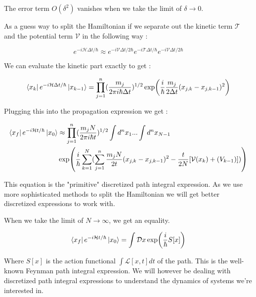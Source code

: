 The error term $O(\delta^2)$ vanishes when we take the limit of $\delta \to 0$.

As a guess way to split the Hamiltonian if we separate out the kinetic term $\mathcal{T}$ and the potential term $\mathcal{V}$ in the following way :

\begin{equation}\label{4.x}
e^{-i\mathcal{H}\Delta t/\hbar} \approx e^{-i\mathcal{V}\Delta t/2\hbar}e^{-i\mathcal{T}\Delta t/\hbar}e^{-i\mathcal{V}\Delta t/2\hbar} 
\end{equation}

We can evaluate the kinetic part exactly to get :

\begin{equation} \label{4.x}
\bra{x_k}e^{-i\mathcal{H} \Delta t/\hbar}\ket{x_{k-1}} = \prod_{j=1}^{n} (\frac{m_j}{2\pi i \hbar \Delta t})^{1/2} \exp(\frac{i}{\hbar} \frac{m_j}{2\Delta t} (x_{j,k} - x_{j, k-1})^2)
\end{equation}

Plugging this into the propagation expression we get :

\begin{equation} \label{4.x}
    \begin{split}
        \bra{x_f} e^{-i\mathcal{H}t/\hbar} \ket{x_0} & \approx \prod_{j=1}^{n} (\frac{m_j N}{2\pi i \hbar t})^{1/2}  \int d^n x_1 ... \int d^n x_{N-1} \\ & \exp(\frac{i}{\hbar} \sum_{k=1}^{N} (\sum_{j=1}^{n} \frac{m_j N}{2t} (x_{j,k} - x_{j, k-1})^2 - \frac{t}{2N}[\mathcal{V}(x_k) + \mathcal(V_{k-1})]))
    \end{split}
\end{equation}

This equation is the "primitive" discretized path integral expression. As we use more sophisticated methods to split the Hamiltonian we will get better discretized expressions to work with.

When we take the limit of $N \to \infty$, we get an equality.  

\begin{equation}
    \bra{x_f} e^{-i\mathcal{H}t/\hbar}\ket{x_0} = \int \mathcal{D}x \exp(\frac{i}{\hbar} S[x])
\end{equation}

Where $S[x]$ is the action functional $\int \mathcal{L}[x, t] dt$ of the path. This is the well-known Feynman path integral expression. \cite{feynhibbs} We will however be dealing with discretized path integral expressions to understand the dynamics of systems we're interested in.

